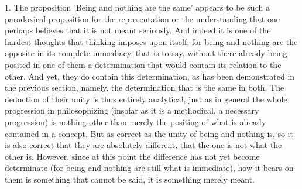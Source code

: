 1. The proposition 'Being and nothing are the same' appears to be
such a paradoxical proposition for the representation or the understanding
that one perhaps believes that it is not meant seriously.
And indeed it is one of the hardest thoughts that
thinking imposes upon itself, for being and nothing are
the opposite in its complete immediacy, that is to say,
without there already being posited in one of them
a determination that would contain its relation to the other.
And yet, they do contain this determination,
as has been demonstrated in the previous section, namely,
the determination that is the same in both.
The deduction of their unity is thus entirely analytical,
just as in general the whole progression in philosophizing
(insofar as it is a methodical, a necessary progression)
is nothing other than merely the positing of
what is already contained in a concept.
But as correct as the unity of being and nothing is,
so it is also correct that they are absolutely different,
that the one is not what the other is.
However, since at this point the difference has not yet
become determinate (for being and nothing are still what is immediate),
how it bears on them is something that cannot be said,
it is something merely meant.

